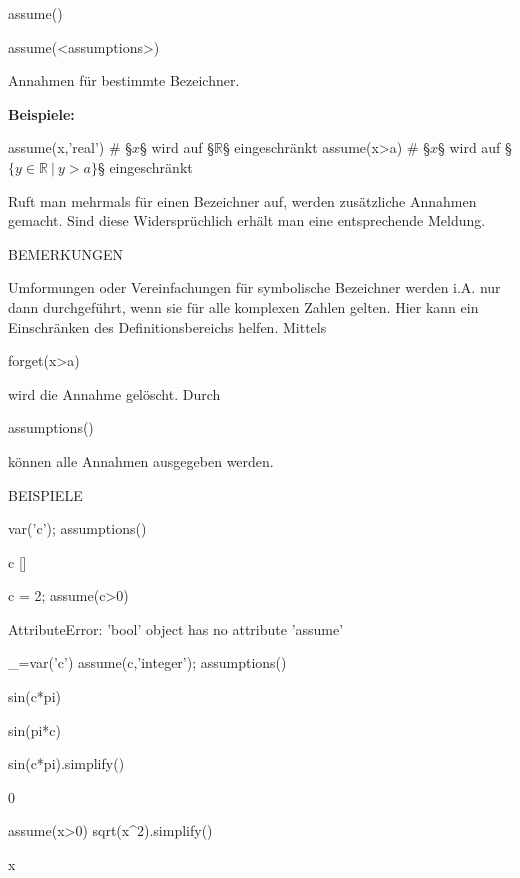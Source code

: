 \documentclass[fontsize=12pt,paper=a4,twoside,bibtotoc,idxtotoc,
liststotoc,pagesize,BCOR1.2cm,DIV15,chapterprefix,pagesize=pdftex]{scrbook}
\theoremstyle{plain}
\theoremstyle{definition}
\theoremstyle{remark}
\begin{document}
assume()

\begin{sagein}
assume(<assumptions>)
\end{sagein}
Annahmen für bestimmte Bezeichner.

\textbf{Beispiele:}
\begin{sagein}
assume(x,'real') # §$x$§ wird auf §$\mathbb{R}$§ eingeschränkt
assume(x>a) # §$x$§ wird auf  §$\{y \in \mathbb{R}\ |\ y>a\}$§ eingeschränkt
\end{sagein}

Ruft man  mehrmals für einen Bezeichner auf, werden zusätzliche Annahmen gemacht. Sind diese
Widersprüchlich erhält man eine entsprechende Meldung.

BEMERKUNGEN


 Umformungen oder Vereinfachungen für symbolische Bezeichner
werden i.A. nur dann durchgeführt,
wenn sie für alle komplexen Zahlen gelten. Hier kann ein Einschränken
des Definitionsbereichs helfen.
 Mittels 
\begin{sagein}
forget(x>a)
\end{sagein}
wird die Annahme  gelöscht.
 Durch 
\begin{sagein}
assumptions() 
\end{sagein}
können alle Annahmen ausgegeben werden.


BEISPIELE

\begin{sagein}
var('c'); assumptions()
\end{sagein}
\begin{sage}
c
[]
\end{sage}

\begin{sagein}
c = 2; assume(c>0)
\end{sagein}
\begin{sage}
 AttributeError: 'bool' object has no attribute 'assume'
\end{sage}
\begin{sagein}
_=var('c')
assume(c,'integer'); assumptions()
\end{sagein}
\begin{sage}
[c is integer]
\end{sage}
\begin{sagein}
sin(c*pi)
\end{sagein}
\begin{sage}
sin(pi*c)
\end{sage}
\begin{sagein}
sin(c*pi).simplify()
\end{sagein}
\begin{sage}
   0
\end{sage}
\begin{sagein}
assume(x>0)
sqrt(x^2).simplify()
\end{sagein}
\begin{sage}
  x
\end{sage}
\end{document}
